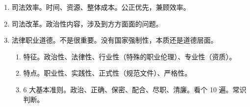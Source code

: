 \begin{enumerate}
        \begin{enumerate}
          \item 实体公正。3 大结果，事实认定结果、法律适用结果、案件的最终处理结果。
          \item 程序公正。过程、步骤、方法。
          \item 内涵。中参公平合廉正。
                \begin{enumerate}
                  \item 司法人员的中立性、司法程序的参与性。各方的诉讼权利都能保障。
                  \item 司法活动的公开性。
                        \begin{enumerate}
                          \item 裁判文书上网。国家秘密、个人隐私（）、未成年、调解结案不公开。
                          \item 检务公开。一般案件 \yjt 相关人员。重大案件 \yjt 社会人员。
                        \end{enumerate}
                  \item 当事人地位的平等性、司法活动的合法性。平等保护双方诉讼权利。
                  \item 司法人员廉洁性。
                        \begin{enumerate}
                          \item 开除吊证，终身禁止。
                          \item 禁止不当接触。3 工。工作需要、工作时间、工作地点。来不及报批  日内报备。
                        \end{enumerate}
                  \item 司法结果的正确性。事实清楚，证据确实充分。
                \end{enumerate}
          \item 审判独立与检察独立。独立行使职权。
                \begin{enumerate}
                  \item 在审案件，不闻、不问、不论。
                  \item 避免领导干部的干预、强化对司法权威的维护、加强对司法人员的履职保障。
                  \item 发布指示，必须书面，记录在案。
                \end{enumerate}
        \end{enumerate}
  \item 司法效率。时间、资源、整体成本。公正优先，兼顾效率。
  \item 司法改革。政治性内容，涉及到方方面面的问题。
  \item 法律职业道德。不是很重要。没有国家强制性，本质还是道德层面。
        \begin{enumerate}
          \item 特征。政治性、法律性、行业性（特殊的职业伦理）、专业性（资质）。
          \item 特点。职业性、实践性、正式性（规范文件）、严格性。
          \item 6 大基本准则。政治、正确、保密、配合、尽职、清廉。看个 10 遍。常识判断。
        \end{enumerate}
\end{enumerate}
